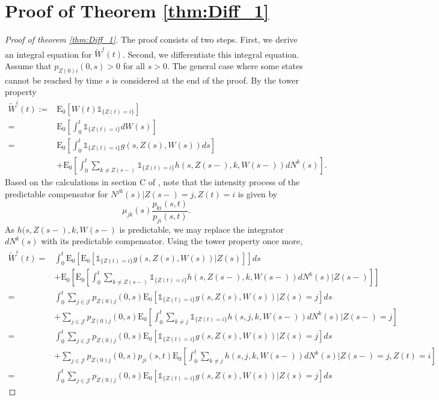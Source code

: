 \documentclass[12pt]{article}
\newcommand{\E}{\text{E}}
\newcommand{\indic}[1]{\mathds{1}_{ \{ #1 \} }}
\theoremstyle{my_thm}
\begin{document}
\section{Proof of Theorem \ref{thm:Diff_1} }
\begin{proof}[Proof of theorem \ref{thm:Diff_1}]
The proof consists of two steps. First, we derive an integral equation for $\tilde{W}^i(t)$. Second, we differentiate this integral equation. \\
Assume that $p_{Z(0)i}(0,s)>0$ for all $s>0$. The general case where some states cannot be reached by time $s$ is considered at the end of the proof. By the tower property
\begin{align*}
\tilde{W}^i(t):=&\E_0[W(t) \indic{Z(t)=i}]
\\
=&
\E_0 \left[ \int_0^t \indic{Z(t)=i} dW(s) \right]
\\
=&
\E_0 \left[ \int_0^t \indic{Z(t)=i} g(s,Z(s),W(s))ds \right]
\\
&+
\E_0 \left[ \int_0^t \sum_{k \neq Z(s-)} \indic{Z(t)=i} h(s,Z(s-),k,W(s-)) dN^k(s)  \right].
\end{align*}
Based on the calculations in section C of \citet{Norberg}, note that the intensity process of the predictable compensator for $N^{jk}(s)|Z(s-)=j, Z(t)=i$ is given by
$$
\mu_{jk}(s)\frac{p_{ki}(s,t)}{p_{ji}(s,t)}.
$$
As $h(s,Z(s-),k,W(s-)$ is predictable, we may replace the integrator $dN^k(s)$ with its predictable compensator. Using the tower property once more,
\begin{align*}
\tilde{W}^i(t)=&
\int_0^t \E_0 \left[ \E_0 \left[ \indic{Z(t)=i} g(s,Z(s),W(s))|Z(s) \right]\right] ds
\\
&+
\E_0 \left[ \E_0 \left[ \int_0^t \sum_{k \neq Z(s-)}\indic{Z(t)=i} h(s,Z(s-),k,W(s-)) dN^k(s) |Z(s-) \right] \right] 
\\
=&
\int_0^t \sum_{j \in \mathcal{J}} p_{Z(0)j}(0,s) \E_0 \left[ \indic{Z(t)=i} g(s,Z(s),W(s))|Z(s)=j\right] ds
\\
&+
  \sum_{j \in \mathcal{J}} p_{Z(0)j}(0,s)   \E_0 \left[\int_0^t \sum_{k \neq j} \indic{Z(t)=i} h(s,j,k,W(s-))  dN^k(s) |Z(s-)=j \right]
 \\
=&
\int_0^t \sum_{j \in \mathcal{J}} p_{Z(0)j}(0,s) \E_0 \left[ \indic{Z(t)=i} g(s,Z(s),W(s))|Z(s)=j\right] ds
\\
&+
  \sum_{j \in \mathcal{J}} p_{Z(0)j}(0,s) p_{ji}(s,t)  \E_0 \left[\int_0^t \sum_{k \neq j}  h(s,j,k,W(s-))  dN^k(s) |Z(s-)=j,Z(t)=i \right]
 \\
=&
\int_0^t \sum_{j \in \mathcal{J}} p_{Z(0)j}(0,s) \E_0 \left[ \indic{Z(t)=i} g(s,Z(s),W(s))|Z(s)=j\right] ds

\end{align*}
\end{proof}
\end{document}
